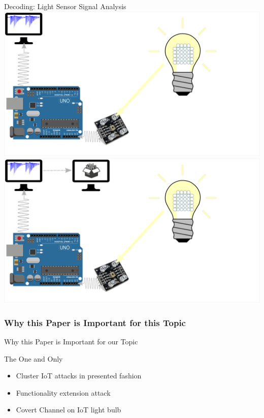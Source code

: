 \documentclass[11pt,t,usepdftitle=false,aspectratio=169]{beamer}
\begin{document}
\begin{frame}{Decoding: Light Sensor Signal Analysis}
{    }
     {
        \centering
        \includegraphics{img/Decoding_4.png}
    }
     {
        \centering
        \includegraphics{img/Decoding_5.png}
    }
\end{frame}

\subsubsection{Why this Paper is Important for this Topic}%
\label{sub:why_this_paper_is_important_for_this_topic}
\begin{frame}{Why this Paper is Important for our Topic}
    \begin{block}{The One and Only}
        \begin{itemize}
            \item Cluster IoT attacks in presented fashion
            \item Functionality extension attack \cite{Guri:2017:xCDEANvRL}
            \item Covert Channel on IoT light bulb
        \end{itemize}
    \end{block}
\end{frame}
\end{document}

